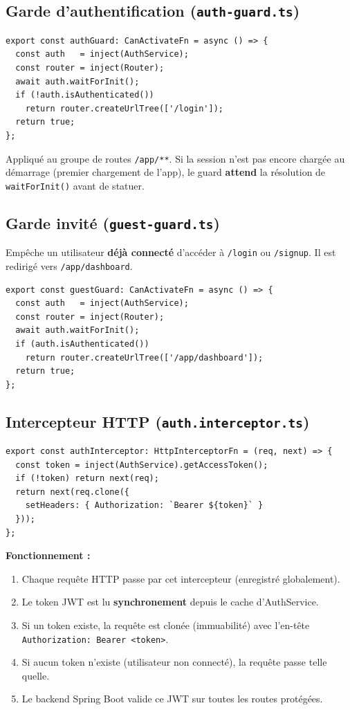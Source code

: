 \documentclass[12pt,a4paper]{article}
\begin{document}
\subsection{Garde d'authentification (\texttt{auth-guard.ts})}

\begin{lstlisting}
export const authGuard: CanActivateFn = async () => {
  const auth   = inject(AuthService);
  const router = inject(Router);
  await auth.waitForInit();
  if (!auth.isAuthenticated())
    return router.createUrlTree(['/login']);
  return true;
};
\end{lstlisting}

Appliqué au groupe de routes \texttt{/app/**}. Si la session n'est pas encore chargée
au démarrage (premier chargement de l'app), le guard \textbf{attend} la résolution
de \texttt{waitForInit()} avant de statuer.

\subsection{Garde invité (\texttt{guest-guard.ts})}

Empêche un utilisateur \textbf{déjà connecté} d'accéder à \texttt{/login} ou
\texttt{/signup}. Il est redirigé vers \texttt{/app/dashboard}.

\begin{lstlisting}
export const guestGuard: CanActivateFn = async () => {
  const auth   = inject(AuthService);
  const router = inject(Router);
  await auth.waitForInit();
  if (auth.isAuthenticated())
    return router.createUrlTree(['/app/dashboard']);
  return true;
};
\end{lstlisting}

\subsection{Intercepteur HTTP (\texttt{auth.interceptor.ts})}

\begin{lstlisting}
export const authInterceptor: HttpInterceptorFn = (req, next) => {
  const token = inject(AuthService).getAccessToken();
  if (!token) return next(req);
  return next(req.clone({
    setHeaders: { Authorization: `Bearer ${token}` }
  }));
};
\end{lstlisting}

\textbf{Fonctionnement :}
\begin{enumerate}
  \item Chaque requête HTTP passe par cet intercepteur (enregistré globalement).
  \item Le token JWT est lu \textbf{synchronement} depuis le cache d'AuthService.
  \item Si un token existe, la requête est clonée (immuabilité) avec l'en-tête
        \texttt{Authorization: Bearer <token>}.
  \item Si aucun token n'existe (utilisateur non connecté), la requête passe telle quelle.
  \item Le backend Spring Boot valide ce JWT sur toutes les routes protégées.
\end{enumerate}
\end{document}
